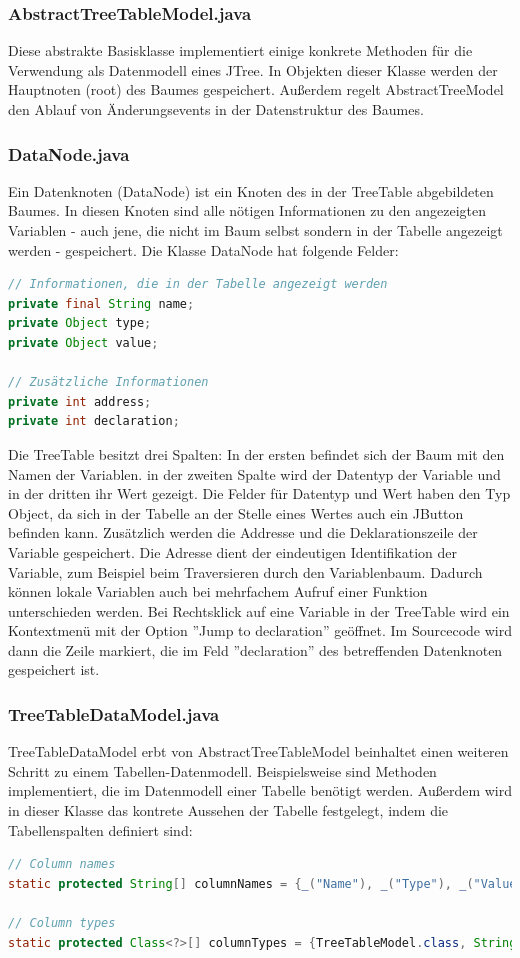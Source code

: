 \subsubsection*{AbstractTreeTableModel.java}
Diese abstrakte Basisklasse implementiert einige konkrete Methoden für die Verwendung als Datenmodell eines JTree. In Objekten dieser Klasse werden der Hauptnoten (root) des Baumes gespeichert. Außerdem regelt AbstractTreeModel den Ablauf von Änderungsevents in der Datenstruktur des Baumes.

\subsubsection*{DataNode.java}
Ein Datenknoten (DataNode) ist ein Knoten des in der TreeTable abgebildeten Baumes. In diesen Knoten sind alle nötigen Informationen zu den angezeigten Variablen - auch jene, die nicht im Baum selbst sondern in der Tabelle angezeigt werden - gespeichert.
\newline
Die Klasse DataNode hat folgende Felder:
\begin{lstlisting}[language=JAVA]
// Informationen, die in der Tabelle angezeigt werden
private final String name;
private Object type;
private Object value;

// Zusätzliche Informationen
private int address;
private int declaration;
\end{lstlisting}
Die TreeTable besitzt drei Spalten: In der ersten befindet sich der Baum mit den Namen der Variablen. in der zweiten Spalte wird der Datentyp der Variable und in der dritten ihr Wert gezeigt. Die Felder für Datentyp und Wert haben den Typ Object, da sich in der Tabelle an der Stelle eines Wertes auch ein JButton befinden kann.
Zusätzlich werden die Addresse und die Deklarationszeile der Variable gespeichert. Die Adresse dient der eindeutigen Identifikation der Variable, zum Beispiel beim Traversieren durch den Variablenbaum. Dadurch können lokale Variablen auch bei mehrfachem Aufruf einer Funktion unterschieden werden.
Bei Rechtsklick auf eine Variable in der TreeTable wird ein Kontextmenü mit der Option ''Jump to declaration'' geöffnet. Im Sourcecode wird dann die Zeile markiert, die im Feld ''declaration'' des betreffenden Datenknoten gespeichert ist.

\subsubsection*{TreeTableDataModel.java}
TreeTableDataModel erbt von AbstractTreeTableModel beinhaltet einen weiteren Schritt zu einem Tabellen-Datenmodell. Beispielsweise sind Methoden implementiert, die im Datenmodell einer Tabelle benötigt werden. Außerdem wird in dieser Klasse das kontrete Aussehen der Tabelle festgelegt, indem die Tabellenspalten definiert sind:
\begin{lstlisting}[language=JAVA]
// Column names
static protected String[] columnNames = {_("Name"), _("Type"), _("Value")};
 
// Column types
static protected Class<?>[] columnTypes = {TreeTableModel.class, String.class, Object.class};
\end{lstlisting}

